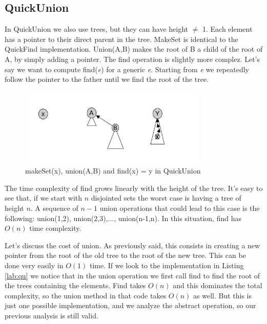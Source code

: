 \documentclass{article}
\begin{document}
\subsection{QuickUnion} \label{QU}
In QuickUnion we also use trees, but they can have height $\neq$ 1. Each element has a pointer to their
direct parent in the tree. MakeSet is identical to the QuickFind implementation. Union(A,B) makes the root of B a child of the 
root of A, by simply adding a pointer. The find operation is slightly more complez. Let's say
we want to compute find(\emph{e}) for a generic \emph{e}. Starting from \emph{e} we repeatedly 
follow the pointer to the father until we find the root of the tree.
\begin{figure}[h!]
    \centering
    \includegraphics[width=0.8\textwidth]  {img/uf.jpg}
    \caption{makeSet(x), union(A,B) and find(x) = y in QuickUnion}
    \label{fig:quickUnion}
\end{figure}

The time complexity of find grows linearly with the height of the tree. It's easy to see
that, if we start with $n$ disjointed sets the worst case is having a tree of height $n$. A sequence
of $n-1$ union operations that could lead to this case is the following: union(1,2), union(2,3),..., union(n-1,n).
In this situation, find has $O(n)$ time complexity. 
\begin{center}
     
\end{center}
Let's discuss the cost of union. As previously said,
this consists in creating a new pointer from the root of the old tree to the root of the new tree. This can be done 
very easily in $O(1)$ time. If we look to the implementation in Listing \ref{lab:qu} we notice
that in the union operation we first call find to find the root of the trees containing the elements. Find takes $O(n)$ and this dominates the 
total complexity, so the union method in that code takes $ O(n)$ as well. But this is just one possible implementation, and we analyze
the abstract operation, so our previous analysis is still valid. 
\end{document}
